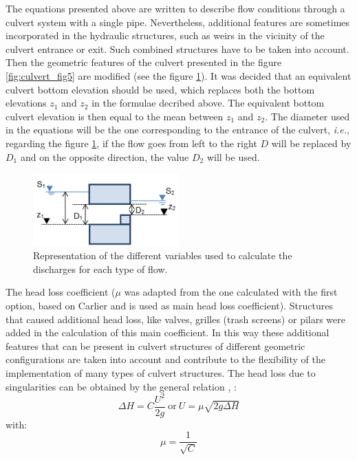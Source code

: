 The equations presented above are written to describe flow conditions through a
culvert system with a single pipe.
Nevertheless, additional features are sometimes incorporated in the hydraulic structures,
such as weirs in the vicinity of the culvert entrance or exit.
Such combined structures have to be taken into account.
Then the geometric features of the culvert presented in the figure \ref{fig:culvert_fig5}
are modified (see the figure \ref{fig:culvert_fig6}).
It was decided that an equivalent culvert bottom elevation should be used,
which replaces both the bottom elevations $z_1$ and $z_2$ in the formulae decribed above.
The equivalent bottom culvert elevation is then equal to the mean between $z_1$ and $z_2$.
The diameter used in the equations will be the one corresponding to the entrance of the culvert,
\textit{i.e.}, regarding the figure \ref{fig:culvert_fig6}, if the flow goes from left
to the right $D$ will be replaced by $D_1$ and on the opposite direction,
the value $D_2$ will be used.

\begin{figure}[H]
\begin{center}
  \includegraphics[width=0.5\textwidth]{graphics/culvert_fig6.png}
\end{center}
\caption{Representation of the different variables used to
calculate the discharges for each type of flow.}
\label{fig:culvert_fig6}
\end{figure}

The head loss coefficient ($\mu$ was adapted from the one calculated with the first option,
based on Carlier \cite{Carlier1972} and is used as main head loss coefficient).
Structures that caused additional head loss, like valves, grilles (trash screens) or pilars
were added in the calculation of this main coefficient.
In this way these additional features that can be present in culvert structures of
different geometric configurations are taken into account and contribute to
the flexibility of the implementation of many types of culvert structures.
The head loss due to singularities can be obtained by the general
relation \cite{Lencastre1961}, \cite{Carlier1972}:
\begin{equation}
\Delta H = C \dfrac{U^2}{2g} ~\text{or}~  U = \mu \sqrt{2g\Delta H}
\end{equation}
with:
\begin{equation}
\mu =\dfrac{1}{\sqrt{C}}
\end{equation}

